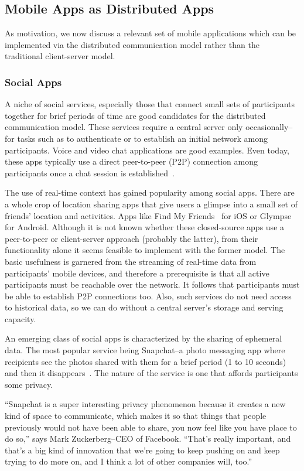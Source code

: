 \documentclass[prodmode]{acmlarge}
\begin{document}
\subsection{Mobile Apps as Distributed Apps}
As motivation, we now discuss a relevant set of mobile applications which can be implemented via the distributed communication model rather than the traditional client-server model.

\subsubsection{Social Apps}
A niche of social services, especially those that connect small sets of participants together for brief periods of time are good candidates for the distributed communication model. These services require a central server only occasionally--for tasks such as to authenticate or to establish an initial network among participants. Voice and video chat applications are good examples. Even today, these apps typically use a direct peer-to-peer (P2P) connection among participants once a chat session is established~\cite{SkypeStudy,GoogleTalkLibrary}.

The use of real-time context has gained popularity among social apps. There are a whole crop of location sharing apps that give users a glimpse into a small set of friends' location and activities. Apps like Find My Friends~\cite{FindMyFriends} for iOS or Glympse~\cite{Glympse} for Android. Although it is not known whether these closed-source apps use a peer-to-peer or client-server approach (probably the latter), from their functionality alone it seems feasible to implement with the former model. The basic usefulness is garnered from the streaming of real-time data from participants' mobile devices, and therefore a prerequisite is that all active participants must be reachable over the network. It follows that participants must be able to establish P2P connections too. Also, such services do not need access to historical data, so we can do without a central server's storage and serving capacity.

An emerging class of social apps is characterized by the sharing of ephemeral data. The most popular service being Snapchat--a photo messaging app where recipients see the photos shared with them for a brief period (1 to 10 seconds) and then it disappears~\cite{Snapchat}. The nature of the service is one that affords participants some privacy.

``Snapchat is a super interesting privacy phenomenon because it creates a new kind of space to communicate, which makes it so that things that people previously would not have been able to share, you now feel like you have place to do so,'' says Mark Zuckerberg--CEO of Facebook. ``That's really important, and that's a big kind of innovation that we're going to keep pushing on and keep trying to do more on, and I think a lot of other companies will, too.''~\cite{Zuckerberg}
\end{document}
